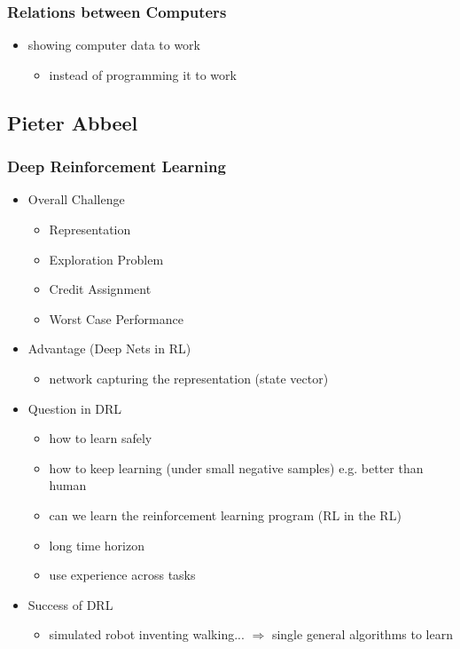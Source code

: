 \subsubsection{Relations between Computers}
\begin{itemize}
\item showing computer data to work
	\begin{itemize}
	\item instead of programming it to work
	\end{itemize}
\end{itemize}


\subsection{Pieter Abbeel}
\subsubsection{Deep Reinforcement Learning}
\begin{itemize}
\item Overall Challenge 
	\begin{itemize}
	\item Representation
	\item Exploration Problem
	\item Credit Assignment
	\item Worst Case Performance
	\end{itemize}
\item Advantage (Deep Nets in RL)
	\begin{itemize}
	\item network capturing the representation (state vector)
	\end{itemize}
\item Question in DRL
	\begin{itemize}
	\item how to learn safely
	\item how to keep learning (under small negative samples) e.g. better than human
	\item can we learn the reinforcement learning program (RL in the RL)
	\item long time horizon
	\item use experience across tasks
	\end{itemize}
\item Success of DRL
	\begin{itemize}
	\item simulated robot inventing walking... $\Rightarrow$ single general algorithms to learn
	\end{itemize}
\end{itemize}

